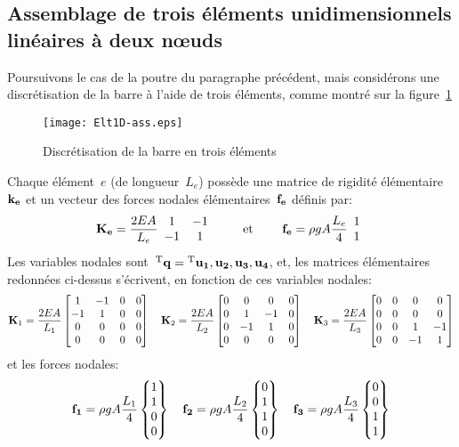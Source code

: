 \subsection{Assemblage de trois éléments unidimensionnels linéaires à deux nœuds}\label{Sec-ass}

Poursuivons le cas de la poutre du paragraphe précédent, mais considérons une discrétisation
de la barre à l'aide de trois éléments, comme montré sur la figure~\ref{fig-ex2ass}
\begin{figure}[ht]\centering
\texttt{[image: Elt1D-ass.eps]}
\caption{Discrétisation de la barre en trois éléments}\label{fig-ex2ass}
\end{figure}
\medskipvm
Chaque élément~$e$ (de longueur~$L_e$) possède une matrice de rigidité élémentaire~$\MM{k_e}$ 
et un vecteur des forces nodales élémentaires~$\VV{f_e}$ définis par:
\begin{equation}
\MM{K_e} = \frac{2EA}{L_e} \MM{\begin{array}{cc} 1 & -1\\ -1& 1 \end{array}}
\qquad \text{ et } \qquad
\VV{f_e} = \rho g A \frac{L_e}4 \VV{\begin{array}{c} 1 \\1 \end{array}}
\end{equation}
\medskipvm
Les variables nodales sont~${}^\mathrm{T}\mathbf{q}={}^\mathrm{T}\mathbf{u_1, u_2, u_3, u_4}$, et, les matrices élémentaires
redonnées ci-dessus s'écrivent, en fonction de ces variables nodales:
\begin{equation*}
\MM{K}_1 = \frac{2EA}{L_1} \MM*{1 & -1 & 0 & 0\\ -1& 1 & 0 & 0\\ 0&0&0&0\\0&0&0&0}
\quad
\MM{K}_2 = \frac{2EA}{L_2} \MM*{0&0&0&0\\ 0& 1 & -1 & 0\\ 0 & -1& 1& 0\\0&0&0&0}
\quad
\MM{K}_3 = \frac{2EA}{L_3} \MM*{0&0&0&0\\0&0&0&0\\0& 0& 1 & -1\\ 0&0 & -1& 1}
\end{equation*}
et les forces nodales:
\begin{equation*}
\VV{f_1} = \rho g A \frac{L_1}4 \VV*{1 \\1\\0\\0}
\quad
\VV{f_2} = \rho g A \frac{L_2}4 \VV*{0\\1 \\1\\0}
\quad
\VV{f_3} = \rho g A \frac{L_3}4 \VV*{0\\0\\1 \\1}
\end{equation*}
